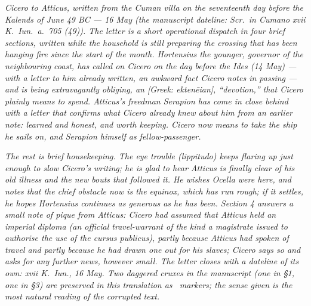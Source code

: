 
\textit{Cicero to Atticus, written from the Cuman villa
on the seventeenth day before the Kalends of June 49 BC ---
16 May (the manuscript dateline: \textit{Scr.\ in Cumano
xvii K.\ Iun.\ a.\ 705 (49)}). The letter is a short
operational dispatch in four brief sections, written
while the household is still preparing the crossing
that has been hanging fire since the start of the month.
Hortensius the younger, governor of the neighbouring
coast, has called on Cicero on the day before the Ides
(14 May) --- with a letter to him already written, an
awkward fact Cicero notes in passing --- and is being
extravagantly obliging, an \textit{[Greek: ekten\=eian]},
``devotion,'' that Cicero plainly means to spend.
Atticus's freedman Serapion has come in close behind
with a letter that confirms what Cicero already knew
about him from an earlier note: learned and honest,
and worth keeping. Cicero now means to take the ship
he sails on, and Serapion himself as fellow-passenger.}

\textit{The rest is brief housekeeping. The eye trouble
(\textit{lippitudo}) keeps flaring up just enough to
slow Cicero's writing; he is glad to hear Atticus is
finally clear of his old illness and the new bouts that
followed it. He wishes Ocella were here, and notes that
the chief obstacle now is the equinox, which has run
rough; if it settles, he hopes Hortensius continues as
generous as he has been. Section 4 answers a small note
of pique from Atticus: Cicero had assumed that Atticus
held an imperial \textit{diploma} (an official
travel-warrant of the kind a magistrate issued to
authorise the use of the cursus publicus), partly
because Atticus had spoken of travel and partly because
he had drawn one out for his slaves; Cicero says so and
asks for any further news, however small. The letter
closes with a dateline of its own: xvii K.\ Iun., 16
May. Two daggered cruxes in the manuscript (one in \S1,
one in \S3) are preserved in this translation as \dag\
markers; the sense given is the most natural reading
of the corrupted text.}
